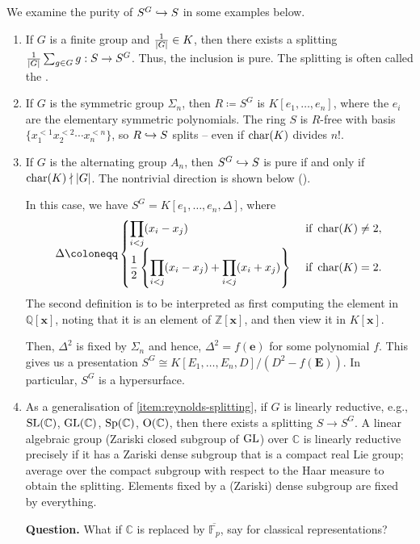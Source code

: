 \documentclass[12pt]{article}
\begin{document}
We examine the purity of $S^{G} \hookrightarrow S$ in some examples below.

\begin{enumerate}[label=(\alph*),leftmargin=0em]
	\item \label{item:reynolds-splitting} If $G$ is a finite group and $\frac{1}{{\left\lvert G \right\lvert}} \in K$, then there exists a splitting $\frac{1}{{\left\lvert G \right\lvert}} \sum_{g \in G} g : S \to S^{G}$. Thus, the inclusion is pure. The splitting is often called the .
	\item If $G$ is the symmetric group $\Sigma_{n}$, then $R \coloneqq S^{G}$ is $K[e_{1}, \ldots, e_{n}]$, where the $e_{i}$ are the elementary symmetric polynomials. \newline
	The ring $S$ is $R$-free with basis $\{x_{1}^{< 1} x_{2}^{< 2} \cdots x_{n}^{< n}\}$, so $R \hookrightarrow S$ splits -- even if $\operatorname{char}(K)$ divides $n!$.
	\item \label{item:alternating-group-description} If $G$ is the alternating group $A_{n}$, then $S^{G} \hookrightarrow S$ is pure if and only if $\operatorname{char}(K) \nmid {\left\lvert G \right\lvert}$. \newline
	The nontrivial direction \forward is shown below ().

	In this case, we have $S^{G} = K[e_{1}, \ldots, e_{n}, \Delta]$, where
	\begin{equation*} 
		\Delta \coloneqq 
		\begin{cases}
			\displaystyle\prod_{i < j} (x_{i} - x_{j}) & \text{ if } \chr(K) \neq 2, \\
			\displaystyle \frac{1}{2} \left\{\prod_{i < j} (x_{i} - x_{j}) + \prod_{i < j} (x_{i} + x_{j})\right\} & \text{ if } \chr(K) = 2.
		\end{cases}
	\end{equation*}
	The second definition is to be interpreted as first computing the element in $\mathbb{Q}[\mathbf{x}]$, noting that it is an element of $\mathbb{Z}[\mathbf{x}]$, and then view it in $K[\mathbf{x}]$.

	Then, $\Delta^{2}$ is fixed by $\Sigma_{n}$ and hence, $\Delta^{2} = f(\mathbf{e})$ for some polynomial $f$. This gives us a presentation $S^{G} \cong K[E_{1}, \ldots, E_{n}, D]/(D^{2} - f(\mathbf{E}))$. In particular, $S^{G}$ is a hypersurface.
	\item \label{item:linearly-reductive-classical} As a generalisation of \ref{item:reynolds-splitting}, if $G$ is linearly reductive, e.g., $\operatorname{SL}(\mathbb{C})$, $\operatorname{GL}(\mathbb{C})$, $\operatorname{Sp}(\mathbb{C})$, $\operatorname{O}(\mathbb{C})$, then there exists a splitting $S \to S^{G}$. A linear algebraic group (Zariski closed subgroup of $\operatorname{GL}$) over $\mathbb{C}$ is linearly reductive precisely if it has a Zariski dense subgroup that is a compact real Lie group; average over the compact subgroup with respect to the Haar measure to obtain the splitting. Elements fixed by a (Zariski) dense subgroup are fixed by everything.

	\textbf{Question.} What if $\mathbb{C}$ is replaced by $\overline{\mathbb{F}_{p}}$, say for classical representations?
\end{enumerate}
\end{document}
